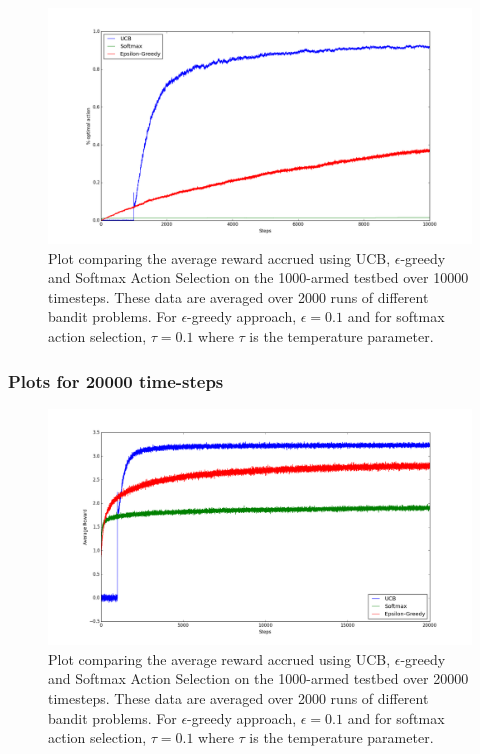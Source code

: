 \documentclass[english]{article}
\begin{document}
\begin{figure}[H]
  \includegraphics[width=\linewidth]{compare_ucb_1000_arms_10000_steps_optimal_action.png}
  \caption{Plot comparing the average reward accrued using UCB, $\epsilon$-greedy and Softmax Action Selection on the 1000-armed testbed over 10000 timesteps. These data are averaged over 2000 runs of different bandit problems. For $\epsilon$-greedy approach, $\epsilon = 0.1 $ and for softmax action selection, $\tau = 0.1$ where $\tau$ is the temperature parameter.}
  \label{fig:eg1}
\end{figure}

\subsubsection{Plots for 20000 time-steps}
\begin{figure}[H]
  \includegraphics[width=\linewidth]{compare_ucb_1000_arms_20000_steps_average_reward.png}
  \caption{Plot comparing the average reward accrued using UCB, $\epsilon$-greedy and Softmax Action Selection on the 1000-armed testbed over 20000 timesteps. These data are averaged over 2000 runs of different bandit problems. For $\epsilon$-greedy approach, $\epsilon = 0.1 $ and for softmax action selection, $\tau = 0.1$ where $\tau$ is the temperature parameter.}
  \label{fig:eg1}
\end{figure}
\end{document}
